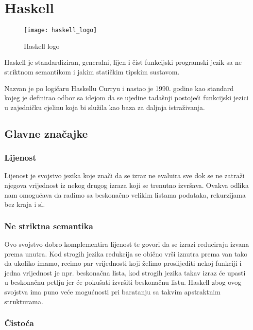 \chapter{Haskell}

\begin{wrapfigure}[7]{l}{0.25\textwidth}
    \centering
    \texttt{[image: haskell\_logo]}
    \caption{Haskell logo}
    \label{lbl:haskell_logo}
\end{wrapfigure}

Haskell je standardiziran, generalni, lijen i čist funkcijski programski jezik sa ne striktnom semantikom i jakim statičkim tipskim sustavom\cite{haskell_history}.

Nazvan je po logičaru Haskellu Curryu i nastao je 1990. godine kao standard kojeg je definirao odbor sa idejom da se ujedine tadašnji postojeći funkcijski jezici u zajedničku cjelinu koja bi služila kao baza za daljnja istraživanja.

\section{Glavne značajke}

\subsection{Lijenost}

Lijenost je svojstvo jezika koje znači da se izraz ne evaluira sve dok se ne zatraži njegova vrijednost iz nekog drugog izraza koji se trenutno izvršava. Ovakva odlika nam omogućava da radimo sa beskonačno velikim listama podataka, rekurzijama bez kraja i sl.\cite{lazy_vs_nonstrict}

\subsection{Ne striktna semantika}

Ovo svojstvo dobro komplementira lijenost te govori da se izrazi reduciraju izvana prema unutra. Kod strogih jezika redukcija se obično vrši iznutra prema van tako da ukoliko imamo, recimo par vrijednosti  koji želimo proslijediti nekoj funkciji i jedna vrijednost je npr. beskonačna lista, kod strogih jezika takav izraz će upasti u beskonačnu petlju jer će pokušati izvršiti beskonačnu listu. Haskell zbog ovog svojstva ima puno veće mogućnosti pri baratanju sa takvim apstraktnim strukturama.\cite{lazy_vs_nonstrict}

\subsection{Čistoća}

